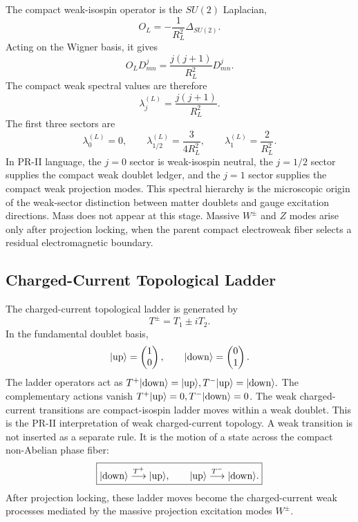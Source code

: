 \documentclass[11pt]{article}
\begin{document}
The compact weak-isospin operator is the \(SU(2)\) Laplacian,
\begin{equation}
O_L
=
-\frac{1}{R_L^2}
\Delta_{SU(2)}.
\end{equation}
Acting on the Wigner basis, it gives
\begin{equation}
O_LD^j_{mn}
=
\frac{j(j+1)}{R_L^2}
D^j_{mn}.
\end{equation}
The compact weak spectral values are therefore
\begin{equation}
\boxed{
\lambda_j^{(L)}
=
\frac{j(j+1)}{R_L^2}.
}
\end{equation}
The first three sectors are
\begin{equation}
\boxed{
\lambda_{0}^{(L)} = 0,
\qquad
\lambda_{1/2}^{(L)} = \frac{3}{4R_L^2},
\qquad
\lambda_{1}^{(L)} = \frac{2}{R_L^2}.
}
\end{equation}
In PR-II language, the \(j=0\) sector is weak-isospin neutral, the \(j=1/2\) sector supplies the compact weak doublet ledger, and the \(j=1\) sector supplies the compact weak projection modes. This spectral hierarchy is the microscopic origin of the weak-sector distinction between matter doublets and gauge excitation directions. 
Mass does not appear at this stage. 
Massive \(W^\pm\) and \(Z\) modes arise only after projection locking, when the parent compact electroweak fiber selects a residual electromagnetic boundary.

\subsection{Charged-Current Topological Ladder}
\label{sec:pr2_charged_current_topological_ladder}

The charged-current topological ladder is generated by
\begin{equation}
T^\pm
=
T_1\pm iT_2.
\end{equation}
In the fundamental doublet basis,
\begin{equation}
|{\rm up}\rangle
=
\begin{pmatrix}
1\\
0
\end{pmatrix},
\qquad
|{\rm down}\rangle
=
\begin{pmatrix}
0\\
1
\end{pmatrix}.
\end{equation}
The ladder operators act as $T^+|{\rm down}\rangle = |{\rm up}\rangle, \space T^-|{\rm up}\rangle = |{\rm down}\rangle.$ The complementary actions vanish $T^+|{\rm up}\rangle=0,\space T^-|{\rm down}\rangle=0$. The weak charged-current transitions are compact-isospin ladder moves within a weak doublet. This is the PR-II interpretation of weak charged-current topology. A weak transition is not inserted as a separate rule. It is the motion of a state across the compact non-Abelian phase fiber:
\begin{equation}
\boxed{
|{\rm down}\rangle
\overset{T^+}{\longrightarrow}
|{\rm up}\rangle,
\qquad
|{\rm up}\rangle
\overset{T^-}{\longrightarrow}
|{\rm down}\rangle.
}
\end{equation}
After projection locking, these ladder moves become the charged-current weak processes mediated by the massive projection excitation modes \(W^\pm\).
\end{document}
